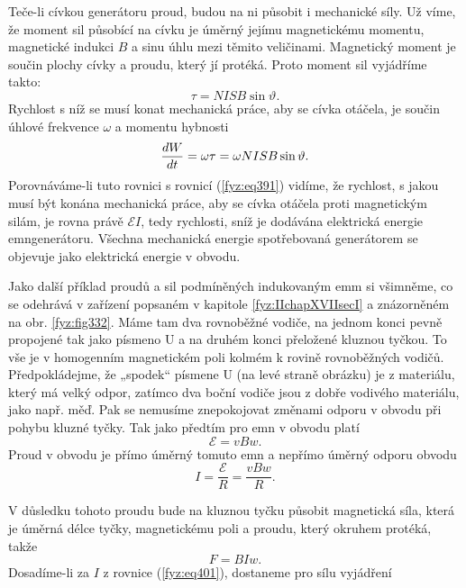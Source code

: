 {  Teče-li cívkou generátoru proud, budou na ni působit i mechanické síly. Už víme, že moment sil 
  působící na cívku je úměrný jejímu magnetickému momentu, magnetické indukci \(B\) a sinu úhlu 
  mezi těmito veličinami. Magnetický moment je součin plochy cívky a proudu, který jí protéká. 
  Proto moment sil vyjádříme takto:
  \begin{equation}\label{fyz:eq398}
    \tau = NISB\sin\vartheta.
  \end{equation}
  Rychlost s níž se musí konat mechanická práce, aby se cívka otáčela, je součin úhlové frekvence 
  \(\omega\) a momentu hybnosti
  \begin{equation}\label{fyz:eq399}
    \dfrac{d W}{d t} = \omega\tau = \omega NISB\sin\vartheta.
  \end{equation}
  Porovnáváme-li tuto rovnici s rovnicí (\ref{fyz:eq391}) vidíme, že rychlost, s jakou musí být 
  konána mechanická práce, aby se cívka otáčela proti magnetickým silám, je rovna právě 
  \(\mathscr{E}I\), tedy rychlosti, sníž je dodávána elektrická energie emngenerátoru. Všechna 
  mechanická energie spotřebovaná generátorem se objevuje jako elektrická energie v obvodu.
 
  Jako další příklad proudů a sil podmíněných indukovaným emm si všimněme, co se odehrává
  v zařízení popsaném v kapitole \ref{fyz:IIchapXVIIsecI} a znázorněném na obr. \ref{fyz:fig332}. 
  Máme tam dva rovnoběžné vodiče, na jednom konci pevně propojené tak jako písmeno U a na druhém 
  konci přeložené kluznou tyčkou. To vše je v homogenním magnetickém poli kolmém k rovině 
  rovnoběžných vodičů. Předpokládejme, že „spodek“ písmene U (na levé straně obrázku) je z 
  materiálu, který má velký odpor, zatímco dva boční vodiče jsou z dobře vodivého materiálu, jako 
  např. měď. Pak se nemusíme znepokojovat změnami odporu v obvodu při pohybu kluzné tyčky. Tak jako 
  předtím pro emn v obvodu platí
  \begin{equation}\label{fyz:eq400}
    \mathscr{E} = vBw.
  \end{equation}
  Proud v obvodu je přímo úměrný tomuto emn a nepřímo úměrný odporu obvodu
  \begin{equation}\label{fyz:eq401}
    I = \frac{\mathscr{E}}{R} = \frac{vBw}{R}.
  \end{equation}
  
  V důsledku tohoto proudu bude na kluznou tyčku působit magnetická síla, která je úměrná délce 
  tyčky, magnetickému poli a proudu, který okruhem protéká, takže
  \begin{equation}\label{fyz:eq402}
    F = BIw.
  \end{equation}
  Dosadíme-li za \(I\) z rovnice (\ref{fyz:eq401}), dostaneme pro sílu vyjádření
  
}
